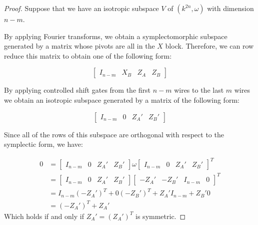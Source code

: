 \begin{proof}
Suppose that we have an isotropic subspace $V$ of $(k^{2n},\omega)$ with dimension $n-m$.

By applying Fourier transforms, we obtain a symplectomorphic subspace generated by a matrix whose pivots are all in the $X$ block.  Therefore, we can row reduce this matrix to obtain one of the following form:

$$
\left[\begin{array}{cc|cc}
I_{n-m} & X_B & Z_A & Z_B 
\end{array}\right]
$$

By applying controlled shift gates from the first $n-m$ wires to the last $m$ wires we obtain an isotropic subspace generated by a matrix of the following form:


$$
\left[\begin{array}{cc|cc}
I_{n-m} & 0 & Z_A' & Z_B' 
\end{array}\right]
$$

Since all of the rows of this subspace are orthogonal with respect to the symplectic form, we have:

\begin{align*}
0 &=
\left[\begin{array}{cc|cc}
I_{n-m} & 0 & Z_A' & Z_B' 
\end{array}\right]
\omega
\left[\begin{array}{cc|cc}
I_{n-m} & 0 & Z_A' & Z_B' 
\end{array}\right]^T\\
&=
\left[\begin{array}{cc|cc}
I_{n-m} & 0 & Z_A' & Z_B' 
\end{array}\right]
\left[\begin{array}{cc|cc}
 -Z_A' & -Z_B'  & I_{n-m} & 0
\end{array}\right]^T\\
&=
I_{n-m}(-Z_A')^T +  0( -Z_B' )^T +Z_A'I_{n-m} + Z_B' 0 \\
&=
(-Z_A')^T +Z_A'
\end{align*}
Which holds if and only if $Z_A'=(Z_A')^T$ is symmetric.


\end{proof}
